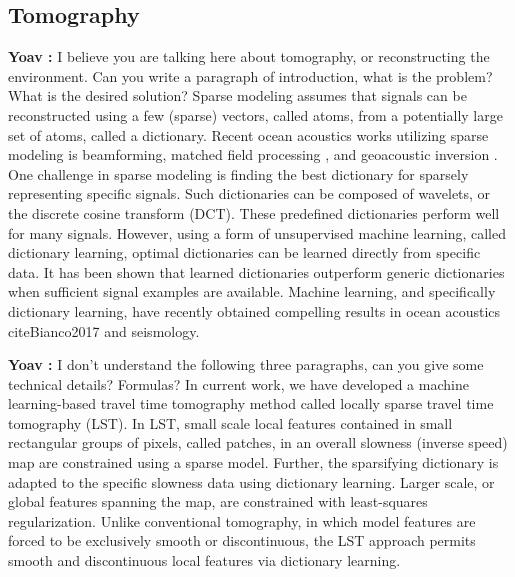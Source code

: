\documentclass{article}
\newcommand{\comment}[3]{{\color{#1} {\bf #2 :} #3}}
\newcommand{\yoav}[1]{\comment{magenta}{Yoav}{#1}}
\begin{document}
\subsection{Tomography}
\yoav{I believe you are talking here about tomography, or reconstructing the environment. Can you write a paragraph of introduction, what is the problem? What is the desired solution?}
Sparse modeling assumes that signals can be reconstructed using a few (sparse) vectors, called atoms, from a potentially large set of atoms, called a dictionary. Recent ocean acoustics works utilizing sparse modeling is beamforming\cite{Xenaki2014}, matched field processing \cite{Gemba2017}, and geoacoustic inversion \cite{gerstoft2018}. One challenge in sparse modeling is finding the best dictionary for sparsely representing specific signals. Such dictionaries can be composed of wavelets, or the discrete cosine transform (DCT). These predefined dictionaries perform well for many signals. However, using a form of unsupervised machine learning, called dictionary learning, optimal dictionaries can be learned directly from specific data\cite{mallat1999}. It has been shown that learned dictionaries outperform generic dictionaries when sufficient signal examples are available. Machine learning, and specifically dictionary learning, have recently obtained compelling results in ocean acoustics cite{Bianco2017} and seismology\cite{kong2018}. 



\yoav{I don't understand the following three paragraphs, can you give some technical details? Formulas?}
In current work, we have developed a machine learning-based travel time tomography method called locally sparse travel time tomography (LST)\cite{bianco2018}. In LST, small scale local features contained in small rectangular groups of pixels, called patches, in an overall slowness (inverse  speed) map are constrained using a sparse model. Further, the sparsifying dictionary is adapted to the specific slowness data using dictionary learning. Larger scale, or global features spanning the  map, are constrained with least-squares regularization. Unlike conventional tomography, in which model features are forced to be exclusively smooth or discontinuous, the LST approach permits smooth and discontinuous local features via dictionary learning. 
\end{document}
